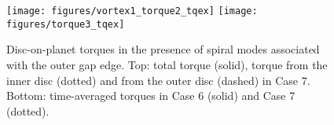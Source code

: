
\begin{figure}
  \centering
  \texttt{[image: figures/vortex1\_torque2\_tqex]}  
  \texttt{[image: figures/torque3\_tqex]} 
  \caption{Disc-on-planet torques in the presence of spiral modes
    associated with the outer gap edge. Top: total torque (solid),
    torque from the inner disc (dotted) and from the outer disc
    (dashed) in Case 7. Bottom: time-averaged torques in Case 6
    (solid) and Case 7 (dotted).
\label{torque3_spiral}}
\end{figure}
